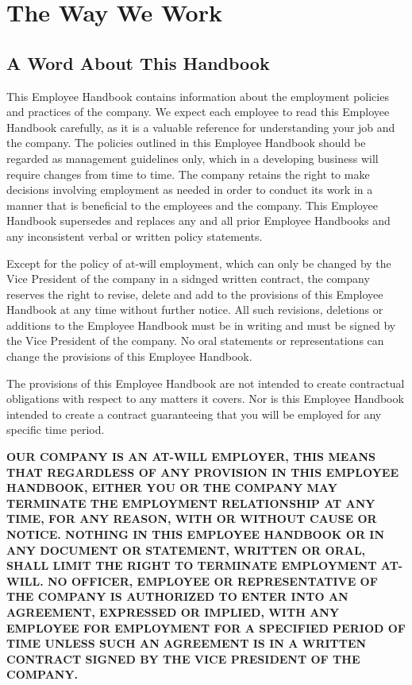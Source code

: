 \section{The Way We Work}

\subsection{A Word About This Handbook}

This Employee Handbook contains information about the employment policies and practices of the company. We expect each employee to read this Employee Handbook carefully, as it is a valuable reference for understanding your job and the company. The policies outlined in this Employee Handbook should be regarded as management guidelines only, which in a developing business will require changes from time to time. The company retains the right to make decisions involving employment as needed in order to conduct its work in a manner that is beneficial to the employees and the company. This Employee Handbook supersedes and replaces any and all prior Employee Handbooks and any inconsistent verbal or written policy statements.

Except for the policy of at-will employment, which can only be changed by the Vice President of the company in a sidnged written contract, the company reserves the right to revise, delete and add to the provisions of this Employee Handbook at any time without further notice. All such revisions, deletions or additions to the Employee Handbook must be in writing and must be signed by the Vice President of the company. No oral statements or representations can change the provisions of this Employee Handbook.

The provisions of this Employee Handbook are not intended to create contractual obligations with respect to any matters it covers. Nor is this Employee Handbook intended to create a contract guaranteeing that you will be employed for any specific time period.

\textbf{OUR COMPANY IS AN AT-WILL EMPLOYER, THIS MEANS THAT REGARDLESS OF ANY PROVISION IN THIS EMPLOYEE HANDBOOK, EITHER YOU OR THE COMPANY MAY TERMINATE THE EMPLOYMENT RELATIONSHIP AT ANY TIME, FOR ANY REASON, WITH OR WITHOUT CAUSE OR NOTICE. NOTHING IN THIS EMPLOYEE HANDBOOK OR IN ANY DOCUMENT OR STATEMENT, WRITTEN OR ORAL, SHALL LIMIT THE RIGHT TO TERMINATE EMPLOYMENT AT-WILL. NO OFFICER, EMPLOYEE OR REPRESENTATIVE OF THE COMPANY IS AUTHORIZED TO ENTER INTO AN AGREEMENT, EXPRESSED OR IMPLIED, WITH ANY EMPLOYEE FOR EMPLOYMENT FOR A SPECIFIED PERIOD OF TIME UNLESS SUCH AN AGREEMENT IS IN A WRITTEN CONTRACT SIGNED BY THE VICE PRESIDENT OF THE COMPANY.}

